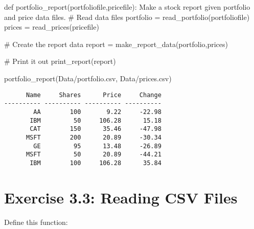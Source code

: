 \documentclass[
  letterpaper,
  DIV=11,
  numbers=noendperiod]{scrreprt}
\newenvironment{Shaded}{\begin{snugshade}}{\end{snugshade}}
\newcommand{\CommentTok}[1]{\textcolor[rgb]{0.37,0.37,0.37}{#1}}
\newcommand{\KeywordTok}[1]{\textcolor[rgb]{0.00,0.46,0.62}{#1}}
\newcommand{\NormalTok}[1]{\textcolor[rgb]{0.00,0.46,0.62}{#1}}
\newcommand{\OperatorTok}[1]{\textcolor[rgb]{0.37,0.37,0.37}{#1}}
\newcommand{\StringTok}[1]{\textcolor[rgb]{0.13,0.47,0.30}{#1}}
\begin{document}
\begin{Shaded}
\begin{Highlighting}[]
\KeywordTok{def}\NormalTok{ portfolio\_report(portfoliofile,pricefile):        }
    \CommentTok{\textquotesingle{}\textquotesingle{}\textquotesingle{}}
\CommentTok{    Make a stock report given portfolio and price data files.}
\CommentTok{    \textquotesingle{}\textquotesingle{}\textquotesingle{}}
    \CommentTok{\# Read data files }
\NormalTok{    portfolio }\OperatorTok{=}\NormalTok{ read\_portfolio(portfoliofile)}
\NormalTok{    prices }\OperatorTok{=}\NormalTok{ read\_prices(pricefile)}

    \CommentTok{\# Create the report data}
\NormalTok{    report }\OperatorTok{=}\NormalTok{ make\_report\_data(portfolio,prices)}

    \CommentTok{\# Print it out}
\NormalTok{    print\_report(report)}
    
\NormalTok{portfolio\_report(}\StringTok{\textquotesingle{}Data/portfolio.csv\textquotesingle{}}\NormalTok{, }\StringTok{\textquotesingle{}Data/prices.csv\textquotesingle{}}\NormalTok{)}
\end{Highlighting}
\end{Shaded}

\begin{verbatim}
      Name     Shares      Price     Change
---------- ---------- ---------- ---------- 
        AA        100       9.22     -22.98
       IBM         50     106.28      15.18
       CAT        150      35.46     -47.98
      MSFT        200      20.89     -30.34
        GE         95      13.48     -26.89
      MSFT         50      20.89     -44.21
       IBM        100     106.28      35.84
\end{verbatim}

\hypertarget{exercise-3.3-reading-csv-files}{%
\section{Exercise 3.3: Reading CSV
Files}\label{exercise-3.3-reading-csv-files}}

Define this function:
\end{document}
